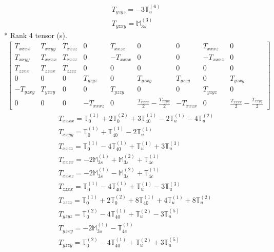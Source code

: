 \documentclass[fleqn,8pt,landscape]{jsarticle}
\begin{document}
\begin{align*}
& T_{yzyz} = - 3 \mathbb{T}_{u}^{(6)} \\
& T_{yzxy} = \mathbb{M}_{3s}^{(3)}
\end{align*}
* Rank 4 tensor (s).
\begin{align*}
\begin{bmatrix} T_{xxxx} & T_{xxyy} & T_{xxzz} & 0 & T_{xxzx} & 0 & 0 & T_{xxxz} & 0 \\ T_{xxyy} & T_{xxxx} & T_{xxzz} & 0 & - T_{xxzx} & 0 & 0 & - T_{xxxz} & 0 \\ T_{zzxx} & T_{zzxx} & T_{zzzz} & 0 & 0 & 0 & 0 & 0 & 0 \\ 0 & 0 & 0 & T_{yzyz} & 0 & T_{yzxy} & T_{yzzy} & 0 & T_{yzxy} \\ - T_{yzxy} & T_{yzxy} & 0 & 0 & T_{yzzy} & 0 & 0 & T_{yzyz} & 0 \\ 0 & 0 & 0 & - T_{xxxz} & 0 & \frac{T_{xxxx}}{2} - \frac{T_{xxyy}}{2} & - T_{xxzx} & 0 & \frac{T_{xxxx}}{2} - \frac{T_{xxyy}}{2} \end{bmatrix}
\end{align*}
\begin{align*}
& T_{xxxx} = \mathbb{T}_{0}^{(1)} + 2 \mathbb{T}_{0}^{(2)} + 3 \mathbb{T}_{40}^{(1)} - 2 \mathbb{T}_{u}^{(1)} - 4 \mathbb{T}_{u}^{(2)} \\
& T_{xxyy} = \mathbb{T}_{0}^{(1)} + \mathbb{T}_{40}^{(1)} - 2 \mathbb{T}_{u}^{(1)} \\
& T_{xxzz} = \mathbb{T}_{0}^{(1)} - 4 \mathbb{T}_{40}^{(1)} + \mathbb{T}_{u}^{(1)} + 3 \mathbb{T}_{u}^{(3)} \\
& T_{xxzx} = - 2 \mathbb{M}_{3s}^{(1)} + \mathbb{M}_{3s}^{(2)} + \mathbb{T}_{4c}^{(1)} \\
& T_{xxxz} = - 2 \mathbb{M}_{3s}^{(1)} - \mathbb{M}_{3s}^{(2)} + \mathbb{T}_{4c}^{(1)} \\
& T_{zzxx} = \mathbb{T}_{0}^{(1)} - 4 \mathbb{T}_{40}^{(1)} + \mathbb{T}_{u}^{(1)} - 3 \mathbb{T}_{u}^{(3)} \\
& T_{zzzz} = \mathbb{T}_{0}^{(1)} + 2 \mathbb{T}_{0}^{(2)} + 8 \mathbb{T}_{40}^{(1)} + 4 \mathbb{T}_{u}^{(1)} + 8 \mathbb{T}_{u}^{(2)} \\
& T_{yzyz} = \mathbb{T}_{0}^{(2)} - 4 \mathbb{T}_{40}^{(1)} + \mathbb{T}_{u}^{(2)} - 3 \mathbb{T}_{u}^{(5)} \\
& T_{yzxy} = - 2 \mathbb{M}_{3s}^{(1)} - \mathbb{T}_{4c}^{(1)} \\
& T_{yzzy} = \mathbb{T}_{0}^{(2)} - 4 \mathbb{T}_{40}^{(1)} + \mathbb{T}_{u}^{(2)} + 3 \mathbb{T}_{u}^{(5)}
\end{align*}
\end{document}
